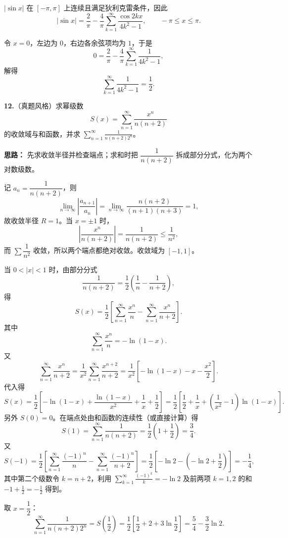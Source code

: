 $|\sin x|$ 在 $[-\pi,\pi]$ 上连续且满足狄利克雷条件，因此
\[
|\sin x|
=\frac{2}{\pi}-\frac{4}{\pi}\sum_{k=1}^{\infty}\frac{\cos 2kx}{4k^2-1},
\qquad -\pi\le x\le\pi.
\]

令 $x=0$，左边为 $0$，右边各余弦项均为 $1$，于是
\[
0=\frac2\pi-\frac4\pi\sum_{k=1}^{\infty}\frac{1}{4k^2-1},
\]
解得
\[
\sum_{k=1}^{\infty}\frac{1}{4k^2-1}=\frac12.
\]

\else \answerarea[10] \fi%

\textbf{12.}（真题风格）求幂级数
\[
S(x)=\sum_{n=1}^{\infty}\frac{x^n}{n(n+2)}
\]
的收敛域与和函数，并求 $\displaystyle\sum_{n=1}^{\infty}\frac{1}{n(n+2)2^n}$。

\ifshowsolutions%
\textbf{思路：} 先求收敛半径并检查端点；求和时把 $\dfrac{1}{n(n+2)}$ 拆成部分分式，化为两个对数级数。

记 $a_n=\dfrac{1}{n(n+2)}$，则
\[
\lim_{n\to\infty}\left|\frac{a_{n+1}}{a_n}\right|
=\lim_{n\to\infty}\frac{n(n+2)}{(n+1)(n+3)}=1,
\]
故收敛半径 $R=1$。当 $x=\pm1$ 时，
\[
\left|\frac{x^n}{n(n+2)}\right|=\frac{1}{n(n+2)}\le\frac{1}{n^2},
\]
而 $\sum\dfrac1{n^2}$ 收敛，所以两个端点都绝对收敛。收敛域为 $[-1,1]$。

当 $0<|x|<1$ 时，由部分分式
\[
\frac{1}{n(n+2)}=\frac12\left(\frac1n-\frac1{n+2}\right),
\]
得
\[
S(x)=\frac12\left[
\sum_{n=1}^{\infty}\frac{x^n}{n}
-\sum_{n=1}^{\infty}\frac{x^n}{n+2}
\right].
\]
其中
\[
\sum_{n=1}^{\infty}\frac{x^n}{n}=-\ln(1-x).
\]
又
\[
\sum_{n=1}^{\infty}\frac{x^n}{n+2}
=\frac1{x^2}\sum_{n=1}^{\infty}\frac{x^{n+2}}{n+2}
=\frac1{x^2}\left[-\ln(1-x)-x-\frac{x^2}{2}\right].
\]
代入得
\[
S(x)=\frac12\left[
-\ln(1-x)+\frac{\ln(1-x)}{x^2}+\frac1x+\frac12
\right]
=\frac12\left[
\frac12+\frac1x+\left(\frac1{x^2}-1\right)\ln(1-x)
\right].
\]
另外 $S(0)=0$。在端点处由和函数的连续性（或直接计算）得
\[
S(1)=\sum_{n=1}^{\infty}\frac{1}{n(n+2)}
=\frac12\left(1+\frac12\right)=\frac34.
\]
又
\[
S(-1)=\frac12\left[\sum_{n=1}^{\infty}\frac{(-1)^n}{n}-\sum_{n=1}^{\infty}\frac{(-1)^n}{n+2}\right]
=\frac12\left[-\ln2-\left(-\ln2+\frac12\right)\right]
=-\frac14,
\]
其中第二个级数令 $k=n+2$，利用 $\sum_{k=1}^{\infty}\frac{(-1)^k}{k}=-\ln2$ 及前两项 $k=1,2$ 的和 $-1+\frac12=-\frac12$ 得到。

取 $x=\dfrac12$：
\[
\sum_{n=1}^{\infty}\frac{1}{n(n+2)2^n}
=S\left(\frac12\right)
=\frac12\left[\frac12+2+3\ln\frac12\right]
=\frac54-\frac32\ln2.
\]

\else \answerarea[10] \fi%
